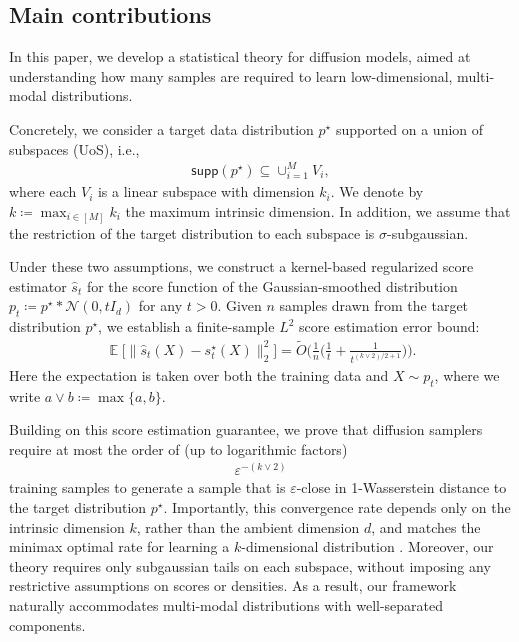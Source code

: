 \documentclass{article}
\newcommand{\defn}{\coloneqq}
\newcommand{\cN}{\mathcal{N}}
\newcommand{\bE}{\mathbb{E}}
\newcommand{\wh}{\widehat}
\newcommand{\wt}{\widetilde}
\newcommand{\veps}{\varepsilon}
\newcommand{\supp}{\mathsf{supp}}
\theoremstyle{plain}
\theoremstyle{remark}
\begin{document}
\subsection{Main contributions}
In this paper, we develop a statistical theory for diffusion models, aimed at understanding how many samples are required to learn low-dimensional, multi-modal distributions.

Concretely, we consider a target data distribution $p^\star$ supported on a union of subspaces (UoS), i.e., 
\begin{align*}
    \supp (p^\star) \subseteq \cup _{i=1}^M V_i,     
\end{align*}
where each $V_i$ is a linear subspace with dimension $k_i$. We denote by $k \defn \max_{i\in[M]} k_i$ the maximum intrinsic dimension. In addition, we assume that the restriction of the target distribution to each subspace is $\sigma$-subgaussian.

Under these two assumptions, we construct a kernel-based regularized score estimator $\wh s_t$ for the score function of the Gaussian-smoothed distribution $p_t \defn p^\star \ast \cN(0,tI_d)$ for any $t>0$.
Given $n$ samples drawn from the target distribution $p^\star$, we establish a finite-sample $L^2$ score estimation error bound:
\begin{align*}
    \mathop{\bE}\big[\|\widehat{s}_t(X)-s_t^\star(X)\|_2^2\big]
    = \wt O\bigg(\frac{1}{n}
    \Big( \frac{1}{t}+\frac{1}{t^{{(k\vee2)}/2+1}}\Big) \bigg).
\end{align*}
Here the expectation is taken over both the training data and $X\sim p_t$, where we write $a\vee b \defn \max\{a,b\}$.

Building on this score estimation guarantee, we prove that diffusion samplers require at most the order of (up to logarithmic factors)
\begin{align*}
 \veps^{- (k \vee 2)}
\end{align*}
training samples to generate a sample that is $\veps$-close in 1-Wasserstein distance to the target distribution $p^\star$. 
Importantly, this convergence rate depends only on the intrinsic dimension $k$, rather than the ambient dimension $d$, and matches the minimax optimal rate for learning a $k$-dimensional distribution \citep{chewi2024statisticaloptimaltransport}.
Moreover, our theory requires only subgaussian tails on each subspace, without imposing any restrictive assumptions on scores or densities. As a result, our framework naturally accommodates multi-modal distributions with well-separated components.
\end{document}
